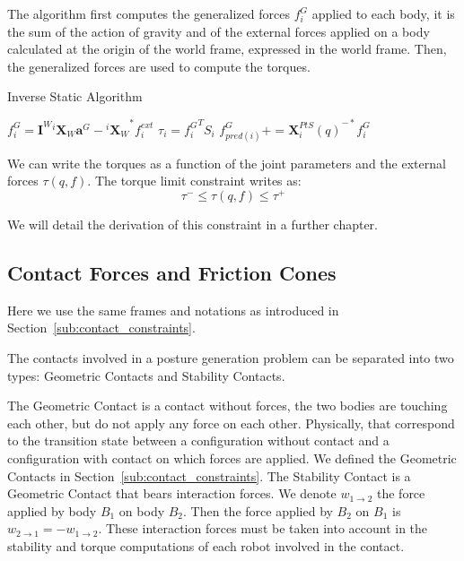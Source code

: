 The algorithm first computes the generalized forces $f^G_i$ applied to each body, it is the sum of the action of gravity and of the external forces applied on a body calculated at the origin of the world frame, expressed in the world frame.
Then, the generalized forces are used to compute the torques.

\begin{algorithm}
  \caption{Inverse Static Algorithm}
\label{IS}
\begin{algorithmic}
  \State$f^G_i = \mathbf{I}^W {}^i\mathbf{X}_W \mathbf{a}^G - {{}^i\mathbf{X}_W}^*f_i^{ext}$
  \EndFor{}
  \State$\tau_i = {f^G_i}^T S_i$
  \State$f^G_{pred(i)} += {\mathbf{X}^{PtS}_i(q)}^{-*} f^G_i$
  \EndIf{}
  \EndFor{}
\end{algorithmic}
\end{algorithm}

We can write the torques as a function of the joint parameters and the external forces $\tau(q,f)$.
The torque limit constraint writes as:
\begin{equation}
  \boxed{\tau^- \leq \tau(q,f) \leq \tau^+}
\end{equation}

We will detail the derivation of this constraint in a further chapter.



\subsection{Contact Forces and Friction Cones}
\label{subsec:contact_forces_and_friction_cones}


Here we use the same frames and notations as introduced in Section~\ref{sub:contact_constraints}.

The contacts involved in a posture generation problem can be separated into two types: Geometric Contacts and Stability Contacts.

The Geometric Contact is a contact without forces, the two bodies are touching each other, but do not apply any force on each other.
Physically, that correspond to the transition state between a configuration without contact and a configuration with contact on which forces are applied.
We defined the Geometric Contacts in Section~\ref{sub:contact_constraints}.
The Stability Contact is a Geometric Contact that bears interaction forces.
We denote $w_{1\rightarrow 2}$ the force applied by body $B_1$ on body $B_2$. Then the force applied by $B_2$ on $B_1$ is $w_{2\rightarrow 1} = -w_{1\rightarrow 2}$.
These interaction forces must be taken into account in the stability and torque computations of each robot involved in the contact.

